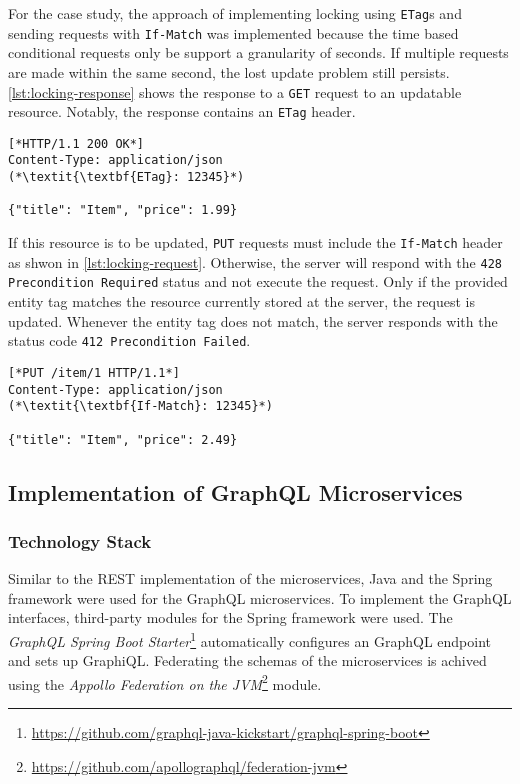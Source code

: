 For the case study, the approach of implementing locking using \texttt{ETag}s and sending requests with \texttt{If-Match} was implemented because the time based conditional requests only be support a granularity of seconds.
If multiple requests are made within the same second, the lost update problem still persists.
\autoref{lst:locking-response} shows the response to a \texttt{GET} request to an updatable resource.
Notably, the response contains an \texttt{ETag} header.

\begin{lstlisting}[caption={Response to \texttt{GET} Requests for Updatable Resources}, showlines=true, label=lst:locking-response, language=http]
[*HTTP/1.1 200 OK*]
Content-Type: application/json
(*\textit{\textbf{ETag}: 12345}*)

{"title": "Item", "price": 1.99}
\end{lstlisting}

If this resource is to be updated, \texttt{PUT} requests must include the \texttt{If-Match} header as shwon in \autoref{lst:locking-request}.
Otherwise, the server will respond with the \texttt{428 Precondition Required} status and not execute the request.
Only if the provided entity tag matches the resource currently stored at the server, the request is updated.
Whenever the entity tag does not match, the server responds with the status code \texttt{412 Precondition Failed}.

\begin{lstlisting}[caption={Request to Update Resources}, showlines=true, label=lst:locking-request, language=http]
[*PUT /item/1 HTTP/1.1*]
Content-Type: application/json
(*\textit{\textbf{If-Match}: 12345}*)

{"title": "Item", "price": 2.49}
\end{lstlisting}

\subsection{Implementation of GraphQL Microservices}

\subsubsection{Technology Stack}

Similar to the \ac{REST} implementation of the microservices, Java and the Spring framework were used for the GraphQL microservices.
To implement the GraphQL interfaces, third-party modules for the Spring framework were used.
The \textit{GraphQL Spring Boot Starter}\footnote{\url{https://github.com/graphql-java-kickstart/graphql-spring-boot}} automatically configures an GraphQL endpoint and sets up GraphiQL.
Federating the schemas of the microservices is achived using the \textit{Appollo Federation on the \acs{JVM}}\footnote{\url{https://github.com/apollographql/federation-jvm}} module.

